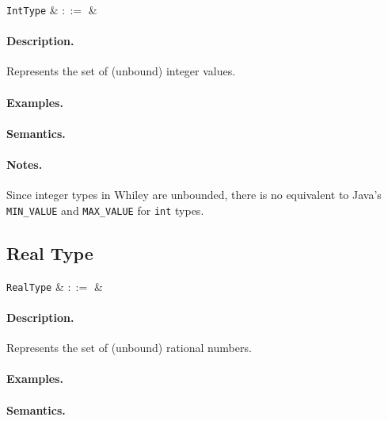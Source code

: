 \begin{syntax}
  \verb+IntType+ & $::=$ &  \\
\end{syntax}

\paragraph{Description.}  Represents the set of (unbound) integer
values. 

\paragraph{Examples.}

\paragraph{Semantics.}

\paragraph{Notes.}  Since integer types in Whiley are unbounded, there
is no equivalent to Java's \lstinline{MIN_VALUE} and \lstinline{MAX_VALUE} for \lstinline{int} types.


\subsection{Real Type}

\begin{syntax}
  \verb+RealType+ & $::=$ &  \\
\end{syntax}

\paragraph{Description.}  Represents the set of (unbound) rational
numbers.

\paragraph{Examples.}

\paragraph{Semantics.}

